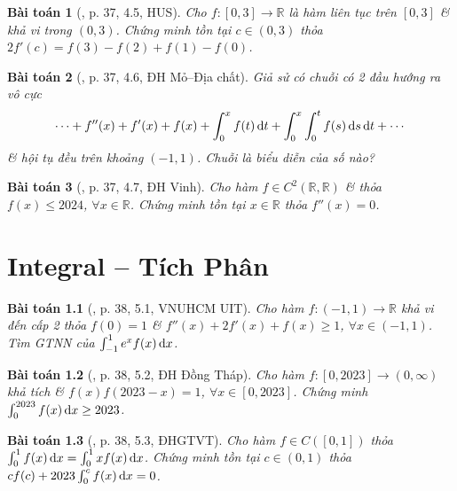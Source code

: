 \documentclass[oneside]{book}
\newtheorem{baitoan}{Bài toán}
\begin{document}
\begin{baitoan}[\cite{VMS_VMC2024}, p. 37, 4.5, HUS]
	Cho $f:[0,3]\to\mathbb{R}$ là hàm liên tục trên $[0,3]$ \& khả vi trong $(0,3)$. Chứng minh tồn tại $c\in(0,3)$ thỏa $2f'(c) = f(3) - f(2) + f(1) - f(0)$.
\end{baitoan}

\begin{baitoan}[\cite{VMS_VMC2024}, p. 37, 4.6, ĐH Mỏ--Địa chất]
	Giả sử có chuỗi có 2 đầu hướng ra vô cực
	\begin{equation*}
		\cdots + f''(x) + f'(x) + f(x) + \int_0^x f(t)\,{\rm d}t + \int_0^x\int_0^t f(s)\,{\rm d}s\,{\rm d}t + \cdots
	\end{equation*}
	\& hội tụ đều trên khoảng $(-1,1)$. Chuỗi là biểu diễn của số nào?
\end{baitoan}

\begin{baitoan}[\cite{VMS_VMC2024}, p. 37, 4.7, ĐH Vinh]
	Cho hàm $f\in C^2(\mathbb{R},\mathbb{R})$ \& thỏa $f(x)\le2024$, $\forall x\in\mathbb{R}$. Chứng minh tồn tại $x\in\mathbb{R}$ thỏa $f''(x) = 0$.
\end{baitoan}


\chapter{Integral -- Tích Phân}
\minitoc

\begin{baitoan}[\cite{VMS_VMC2023}, p. 38, 5.1, VNUHCM UIT]
	Cho hàm $f:(-1,1)\to\mathbb{R}$ khả vi đến cấp 2 thỏa $f(0) = 1$ \& $f''(x) + 2f'(x) + f(x)\ge1$, $\forall x\in(-1,1)$. Tìm {\rm GTNN} của $\int_{-1}^1 e^xf(x)\,{\rm d}x$.
\end{baitoan}

\begin{baitoan}[\cite{VMS_VMC2023}, p. 38, 5.2, ĐH Đồng Tháp]
	Cho hàm $f:[0,2023]\to(0,\infty)$ khả tích \& $f(x)f(2023 - x) = 1$, $\forall x\in[0,2023]$. Chứng minh $\int_0^{2023} f(x)\,{\rm d}x\ge2023$.
\end{baitoan}

\begin{baitoan}[\cite{VMS_VMC2023}, p. 38, 5.3, ĐHGTVT]
	Cho hàm $f\in C([0,1])$ thỏa $\int_0^1 f(x)\,{\rm d}x = \int_0^1 xf(x)\,{\rm d}x$. Chứng minh tồn tại $c\in(0,1)$ thỏa $cf(c) + 2023\int_0^c f(x)\,{\rm d}x = 0$.
\end{baitoan}
\end{document}

